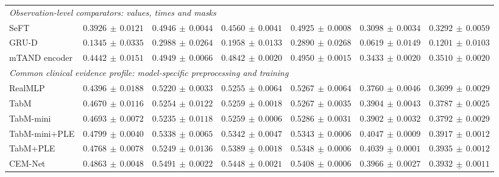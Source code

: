 \begin{table}[tp]
\begin{tabular}{lrrrrrr}
\midrule
\multicolumn{7}{l}{\textit{Observation-level comparators: values, times and masks}} \\
SeFT & $0.3926\,\pm\,0.0121$ & $0.4946\,\pm\,0.0044$ & $0.4560\,\pm\,0.0041$ & $0.4925\,\pm\,0.0008$ & $0.3098\,\pm\,0.0034$ & $0.3292\,\pm\,0.0059$ \\
GRU-D & $0.1345\,\pm\,0.0335$ & $0.2988\,\pm\,0.0264$ & $0.1958\,\pm\,0.0133$ & $0.2890\,\pm\,0.0268$ & $0.0619\,\pm\,0.0149$ & $0.1201\,\pm\,0.0103$ \\
mTAND encoder & $0.4442\,\pm\,0.0151$ & $0.4949\,\pm\,0.0066$ & $0.4842\,\pm\,0.0020$ & $0.4950\,\pm\,0.0015$ & $0.3433\,\pm\,0.0020$ & $0.3510\,\pm\,0.0020$ \\
\midrule
\multicolumn{7}{l}{\textit{Common clinical evidence profile: model-specific preprocessing and training}} \\
RealMLP & $0.4396\,\pm\,0.0188$ & $0.5220\,\pm\,0.0033$ & $0.5255\,\pm\,0.0064$ & $0.5267\,\pm\,0.0064$ & $0.3760\,\pm\,0.0046$ & $0.3699\,\pm\,0.0029$ \\
TabM & $0.4670\,\pm\,0.0116$ & $0.5254\,\pm\,0.0122$ & $0.5259\,\pm\,0.0018$ & $0.5267\,\pm\,0.0035$ & $0.3904\,\pm\,0.0043$ & $0.3787\,\pm\,0.0025$ \\
TabM-mini & $0.4693\,\pm\,0.0072$ & $0.5235\,\pm\,0.0118$ & $0.5259\,\pm\,0.0006$ & $0.5286\,\pm\,0.0031$ & $0.3902\,\pm\,0.0032$ & $0.3792\,\pm\,0.0029$ \\
TabM-mini+PLE & $\underline{0.4799\,\pm\,0.0040}$ & $\underline{0.5338\,\pm\,0.0065}$ & $0.5342\,\pm\,0.0047$ & $0.5343\,\pm\,0.0006$ & $\mathbf{0.4047\,\pm\,0.0009}$ & $0.3917\,\pm\,0.0012$ \\
TabM+PLE & $0.4768\,\pm\,0.0078$ & $0.5249\,\pm\,0.0136$ & $\underline{0.5389\,\pm\,0.0018}$ & $\underline{0.5348\,\pm\,0.0006}$ & $\underline{0.4039\,\pm\,0.0001}$ & $\mathbf{0.3935\,\pm\,0.0012}$ \\
CEM-Net & $\mathbf{0.4863\,\pm\,0.0048}$ & $\mathbf{0.5491\,\pm\,0.0022}$ & $\mathbf{0.5448\,\pm\,0.0021}$ & $\mathbf{0.5408\,\pm\,0.0006}$ & $0.3966\,\pm\,0.0027$ & $\underline{0.3932\,\pm\,0.0011}$ \\
\bottomrule
\end{tabular}
\end{table}
